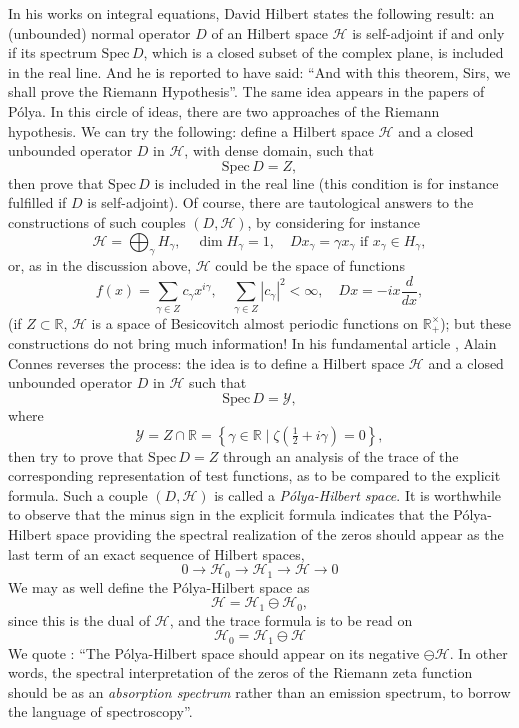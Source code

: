 \documentclass[12pt]{article}
\begin{document}
In his works on integral equations, David Hilbert states the following result: an (unbounded) normal operator $D$ of an Hilbert space $\mathcal{H}$ is self-adjoint if and only if its spectrum $\mathrm{Spec}\, D$, which is a closed subset of the complex plane, is included in the real line. And he is reported to have said: ``And with this theorem, Sirs, we shall prove the Riemann Hypothesis''. The same idea appears in the papers of Pólya. In this circle of ideas, there are two approaches of the Riemann hypothesis. We can try the following: define a Hilbert space $\mathcal{H}$ and a closed unbounded operator $D$ in $\mathcal{H}$, with dense domain, such that
\[
\mathrm{Spec}\, D = Z,
\]
then prove that $\mathrm{Spec}\, D$ is included in the real line (this condition is for instance fulfilled if $D$ is self-adjoint). Of course, there are tautological answers to the constructions of such couples $(D, \mathcal{H})$, by considering for instance
\[
\mathcal{H} = \bigoplus_{\gamma} H_{\gamma}, \quad \dim H_{\gamma} = 1, \quad Dx_{\gamma} = \gamma x_{\gamma} \text{ if } x_{\gamma} \in H_{\gamma},
\]
or, as in the discussion above, $\mathcal{H}$ could be the space of functions
\[
f(x) = \sum_{\gamma \in Z} c_{\gamma} x^{i\gamma}, \quad \sum_{\gamma \in Z} |c_{\gamma}|^2 < \infty, \quad Dx = -ix \frac{d}{dx},
\]
(if $Z \subset \mathbb{R}$, $\mathcal{H}$ is a space of Besicovitch almost periodic functions on $\mathbb{R}_+^{\times}$); but these constructions do not bring much information! In his fundamental article \cite{C}, Alain Connes reverses the process: the idea is to define a Hilbert space $\mathcal{H}$ and a closed unbounded operator $D$ in $\mathcal{H}$ such that
\[
\mathrm{Spec}\, D = \mathcal{Y},
\]
where
\[
\mathcal{Y} = Z \cap \mathbb{R} = \left\{\gamma \in \mathbb{R} \mid \zeta\left(\tfrac{1}{2} + i\gamma\right) = 0\right\},
\]
then try to prove that $\mathrm{Spec}\, D = Z$ through an analysis of the trace of the corresponding representation of test functions, as to be compared to the explicit formula. Such a couple $(D, \mathcal{H})$ is called a \emph{Pólya-Hilbert space}. It is worthwhile to observe that the minus sign in the explicit formula indicates that the Pólya-Hilbert space providing the spectral realization of the zeros should appear as the last term of an exact sequence of Hilbert spaces,
\[
0 \longrightarrow \mathcal{H}_0 \longrightarrow \mathcal{H}_1 \longrightarrow \mathcal{H} \longrightarrow 0
\]
We may as well define the Pólya-Hilbert space as
\[
\mathcal{H} = \mathcal{H}_1 \ominus \mathcal{H}_0,
\]
since this is the dual of $\mathcal{H}$, and the trace formula is to be read on
\[
\mathcal{H}_0 = \mathcal{H}_1 \ominus \mathcal{H}
\]
We quote \cite{C}: ``The Pólya-Hilbert space should appear on its negative $\ominus \mathcal{H}$. In other words, the spectral interpretation of the zeros of the Riemann zeta function should be as an \emph{absorption spectrum} rather than an emission spectrum, to borrow the language of spectroscopy''.
\end{document}
